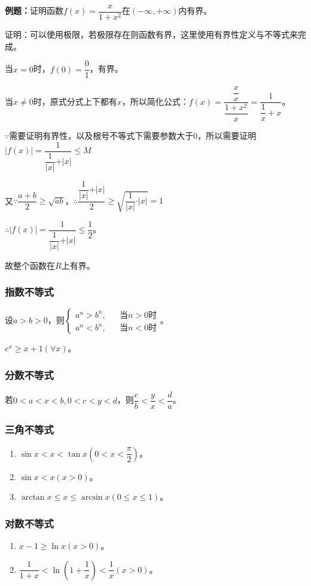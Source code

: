 \textbf{例题：}证明函数$f(x)=\dfrac{x}{1+x^2}$在$(-\infty,+\infty)$内有界。

证明：可以使用极限，若极限存在则函数有界，这里使用有界性定义与不等式来完成。

当$x=0$时，$f(0)=\dfrac{0}{1}$，有界。

当$x\neq 0$时，原式分式上下都有$x$，所以简化公式：$f(x)=\dfrac{\dfrac{x}{x}}{\dfrac{1+x^2}{x}}=\dfrac{1}{\dfrac{1}{x}+x}$。

$\because$需要证明有界性，以及根号不等式下需要参数大于0，所以需要证明$\vert f(x)\vert=\dfrac{1}{\dfrac{1}{\vert x\vert}+\vert x\vert}\leqslant M$

又$\because\dfrac{a+b}{2}\geqslant\sqrt{ab}$，$\therefore \dfrac{\dfrac{1}{\vert x\vert}+\vert x\vert}{2}\geqslant\sqrt{\dfrac{1}{\vert x\vert}\cdot\vert x\vert}=1$

$\therefore\vert f(x)\vert=\dfrac{1}{\dfrac{1}{\vert x\vert}+\vert x\vert}\leqslant\dfrac{1}{2}$。

故整个函数在$R$上有界。

\subsubsection{指数不等式}

设$a>b>0$，则$
\left\{
\begin{array}{lcl}
    a^n>b^n,   &  & \text{当}n>0\text{时} \\
    a^n<b^n, &  & \text{当}n<0\text{时}
\end{array}
\right.$。

$e^x\geqslant x+1(\forall x)$。

\subsubsection{分数不等式}

若$0<a<x<b,0<c<y<d$，则$\dfrac{c}{b}<\dfrac{y}{x}<\dfrac{d}{a}$。

\subsubsection{三角不等式}

\begin{enumerate}
    \item $\sin x<x<\tan x(0<x<\dfrac{\pi}{2})$。
    \item $\sin x<x(x>0)$。
    \item $\arctan x\leqslant x\leqslant\arcsin x(0\leqslant x\leqslant 1)$。
\end{enumerate}

\subsubsection{对数不等式}

\begin{enumerate}
    \item $x-1\geqslant\ln x(x>0)$。
    \item $\dfrac{1}{1+x}<\ln(1+\dfrac{1}{x})<\dfrac{1}{x}(x>0)$。
\end{enumerate}

%
